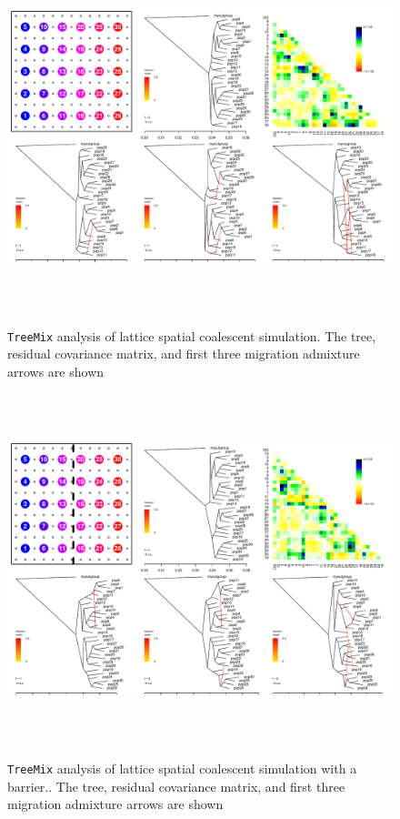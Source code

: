 \documentclass[10pt,letterpaper]{article}
\begin{document}
\clearpage

\begin{figure}
	\centering
		{\includegraphics[width=6in,height=4in]{../figs/sims/Treemix_comparison/ms_dataset_stationary_popstreemix_fig_sequential.pdf}}
	\caption{\texttt{TreeMix} analysis of lattice spatial coalescent simulation.  The tree, residual covariance matrix, and first three migration admixture arrows are shown}\label{sfig:treemix_lattice}
\end{figure}

\begin{figure}
	\centering
		{\includegraphics[width=6in,height=4in]{../figs/sims/Treemix_comparison/ms_dataset_barriertreemix_fig_sequential.pdf}}
	\caption{\texttt{TreeMix} analysis of lattice spatial coalescent simulation with a barrier..  The tree, residual covariance matrix, and first three migration admixture arrows are shown}\label{sfig:treemix_barrier}
\end{figure}
\end{document}
